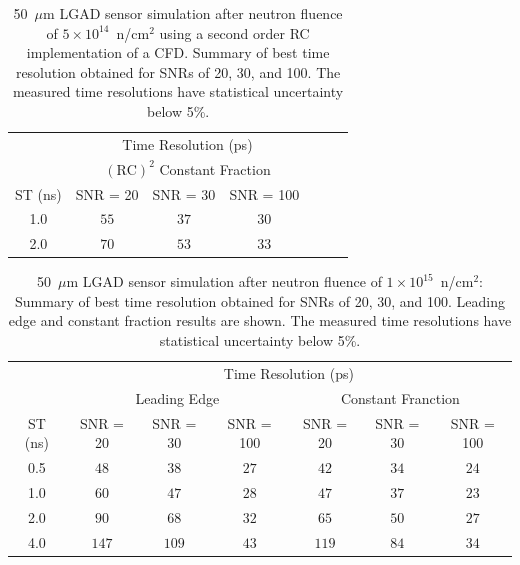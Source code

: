\documentclass[preprint,1p]{elsarticle}
\begin{document}
 \begin{table}
    \begin{center}
     \begin{tabular}{c|ccc|ccc}
     \multicolumn{1}{c}{}& \multicolumn{3}{c}{Time Resolution (ps)} \\
     \multicolumn{1}{c}{}& \multicolumn{3}{c}{$\mathrm{(RC)}^{2}$ Constant Fraction}\\ \hline
     ST (ns) & SNR = 20      & SNR = 30      & SNR = 100 \\
     1.0 & $55$  & $ 37$  & $30$ \\
     2.0 & $70$  & $ 53$  & $33$ \\
     \end{tabular}
     \end{center}
     \caption{50~$\mu$m LGAD sensor simulation after neutron fluence of
      $5\times 10^{14}$~n/cm$^2$ using a second order RC implementation of a CFD.
      Summary of best time resolution obtained for SNRs
     of 20, 30, and 100. The measured time resolutions
    have statistical uncertainty below 5\%.}
\label{tab:shaping_time_5e14_psCFD}
  \end{table}




  \begin{table}
      \begin{tabular}{c|ccc|ccc}
      \multicolumn{1}{c}{}& \multicolumn{6}{c}{Time Resolution (ps)} \\
      \multicolumn{1}{c}{}&\multicolumn{3}{c}{Leading Edge} & \multicolumn{3}{c}{Constant Franction}\\ \hline
      ST (ns) & SNR = 20   & SNR = 30      & SNR = 100     & SNR = 20      & SNR = 30      & SNR = 100 \\
      0.5 & $48$    & $38$    & $27$  & $42$    & $34$  & $24$ \\
      1.0 & $60$    & $47$    & $28$  & $47$    & $37$  & $23$ \\
      2.0 & $90$    & $68$    & $32$  & $65$    & $50$  & $27$ \\
      4.0 & $147$  & $109$  & $43$  & $119$  & $84$  & $34$ \\
      \end{tabular}
      \caption{50~$\mu$m LGAD sensor simulation after neutron fluence of
       $1\times 10^{15}$~n/cm$^2$: Summary of best time resolution obtained for SNRs
      of 20, 30, and 100. Leading edge and constant fraction results are shown. The measured time resolutions
    have statistical uncertainty below 5\%.}
\label{tab:shaping_time_1e_15}
   \end{table}
\end{document}
